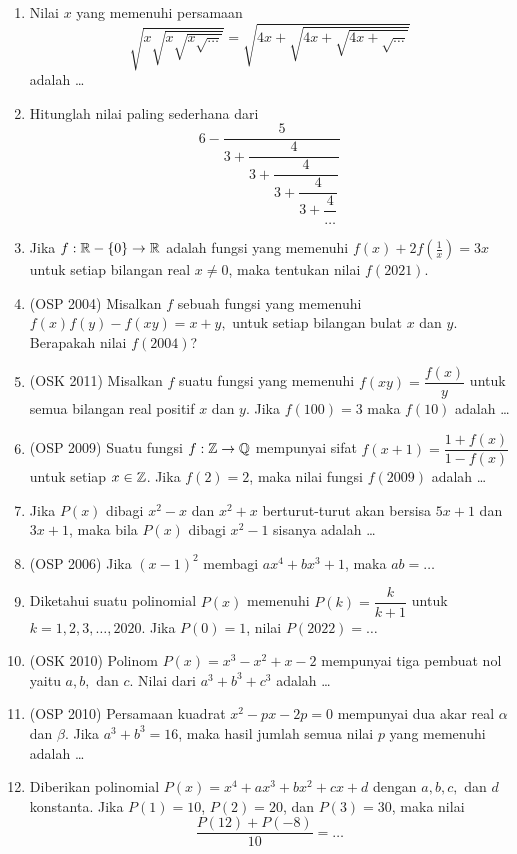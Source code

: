 \documentclass[11pt]{scrartcl}
\begin{document}
\begin{enumerate}
    \item Nilai $x$ yang memenuhi persamaan
    $$\sqrt{x\sqrt{x\sqrt{x\sqrt{\dots}}}}=\sqrt{4x+\sqrt{4x+\sqrt{4x+\sqrt{\dots}}}}$$
    adalah \dots
    
    \item Hitunglah nilai paling sederhana dari
    $$6-\dfrac{5}{3+\dfrac{4}{3+\dfrac{4}{3+\dfrac{4}{3+\dfrac{4}{\dots}}}}}$$
    
    \item Jika $f:\mathbb R-\{0\} \rightarrow \mathbb R$ adalah fungsi yang memenuhi $f(x)+2f\left(\frac{1}{x}\right)=3x$ untuk setiap bilangan real $x \neq 0$, maka tentukan nilai $f(2021).$
    
    \item (OSP 2004) Misalkan $f$ sebuah fungsi yang memenuhi $f(x)f(y)-f(xy)=x+y,$ untuk setiap bilangan bulat $x$ dan $y$. Berapakah nilai $f(2004)$?
    
    \item (OSK 2011) Misalkan $f$ suatu fungsi yang memenuhi $f(xy) = \dfrac{f(x)}{y}$ untuk semua bilangan real positif $x$ dan $y$. Jika $f(100)=3$ maka $f(10)$ adalah \dots
    
    \item (OSP 2009) Suatu fungsi $f:\mathbb Z \rightarrow \mathbb Q$ mempunyai sifat $f(x+1)=\dfrac{1+f(x)}{1-f(x)}$ untuk setiap $x \in \mathbb Z$. Jika $f(2)=2$, maka nilai fungsi $f(2009)$ adalah \dots
    
    \item Jika $P(x)$ dibagi $x^2-x$ dan $x^2+x$ berturut-turut akan bersisa $5x+1$ dan $3x+1$, maka bila $P(x)$ dibagi $x^2-1$ sisanya adalah \dots
    
    \item (OSP 2006) Jika $(x-1)^2$ membagi $ax^4+bx^3+1$, maka $ab=\dots$
    
    \item Diketahui suatu polinomial $P(x)$ memenuhi $P(k)=\dfrac{k}{k+1}$ untuk $k=1,2,3,\dots,2020$. Jika $P(0)=1$, nilai $P(2022)=\dots$
    
    \item (OSK 2010) Polinom $P(x)=x^3-x^2+x-2$ mempunyai tiga pembuat nol yaitu $a,b,$ dan $c$. Nilai dari $a^3+b^3+c^3$ adalah \dots
    
    \item (OSP 2010) Persamaan kuadrat $x^2-px-2p=0$ mempunyai dua akar real $\alpha$ dan $\beta$. Jika $a^3+b^3=16$, maka hasil jumlah semua nilai $p$ yang memenuhi adalah \dots 
    
    \item Diberikan polinomial $P(x)=x^4+ax^3+bx^2+cx+d$ dengan $a,b,c,$ dan $d$ konstanta. Jika $P(1)=10$, $P(2)=20$, dan  $P(3)=30$, maka nilai
    $$\dfrac{P(12)+P(-8)}{10}=\dots$$
\end{enumerate}
\end{document}
